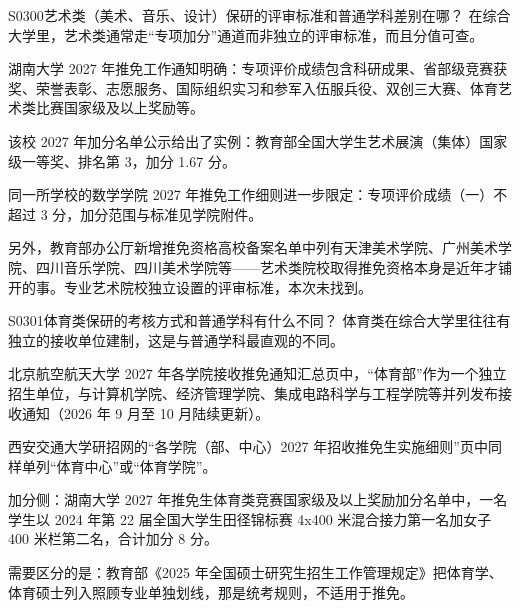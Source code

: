 \begin{qa}{S0300}{艺术类（美术、音乐、设计）保研的评审标准和普通学科差别在哪？}
在综合大学里，艺术类通常走“专项加分”通道而非独立的评审标准，而且分值可查。

湖南大学 2027 年推免工作通知明确：专项评价成绩包含科研成果、省部级竞赛获奖、荣誉表彰、志愿服务、国际组织实习和参军入伍服兵役、双创三大赛、体育艺术类比赛国家级及以上奖励等。

该校 2027 年加分名单公示给出了实例：教育部全国大学生艺术展演（集体）国家级一等奖、排名第 3，加分 1.67 分。

同一所学校的数学学院 2027 年推免工作细则进一步限定：专项评价成绩（一）不超过 3 分，加分范围与标准见学院附件。

另外，教育部办公厅新增推免资格高校备案名单中列有天津美术学院、广州美术学院、四川音乐学院、四川美术学院等——艺术类院校取得推免资格本身是近年才铺开的事。专业艺术院校独立设置的评审标准，本次未找到。
\end{qa}

\begin{qa}{S0301}{体育类保研的考核方式和普通学科有什么不同？}
体育类在综合大学里往往有独立的接收单位建制，这是与普通学科最直观的不同。

北京航空航天大学 2027 年各学院接收推免通知汇总页中，“体育部”作为一个独立招生单位，与计算机学院、经济管理学院、集成电路科学与工程学院等并列发布接收通知（2026 年 9 月至 10 月陆续更新）。

西安交通大学研招网的“各学院（部、中心）2027 年招收推免生实施细则”页中同样单列“体育中心”或“体育学院”。

加分侧：湖南大学 2027 年推免生体育类竞赛国家级及以上奖励加分名单中，一名学生以 2024 年第 22 届全国大学生田径锦标赛 4x400 米混合接力第一名加女子 400 米栏第二名，合计加分 8 分。

需要区分的是：教育部《2025 年全国硕士研究生招生工作管理规定》把体育学、体育硕士列入照顾专业单独划线，那是统考规则，不适用于推免。
\end{qa}


